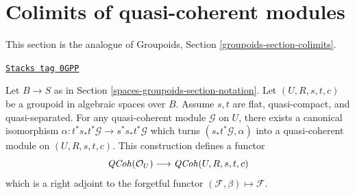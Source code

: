 \section{Colimits of quasi-coherent modules}
\label{spaces-groupoids-section-colimits}
This section is the analogue of
Groupoids, Section \ref{groupoids-section-colimits}.

\begin{lemma}
\label{spaces-groupoids-lemma-construct-quasi-coherent}
\href{https://stacks.math.columbia.edu/tag/0GPP}{\texttt{Stacks tag 0GPP}}

Let $B \to S$ as in Section \ref{spaces-groupoids-section-notation}.
Let $(U, R, s, t, c)$ be a groupoid in algebraic spaces over $B$.
Assume $s, t$ are flat, quasi-compact, and quasi-separated.
For any quasi-coherent module $\mathcal{G}$ on $U$, there exists
a canonical isomorphism
$\alpha : t^*s_*t^*\mathcal{G} \to s^*s_*t^*\mathcal{G}$
which turns $(s_*t^*\mathcal{G}, \alpha)$ into a quasi-coherent module
on $(U, R, s, t, c)$. This construction defines a functor
$$
\mathit{QCoh}(\mathcal{O}_U) \longrightarrow \mathit{QCoh}(U, R, s, t, c)
$$
which is a right adjoint to the forgetful functor
$(\mathcal{F}, \beta) \mapsto \mathcal{F}$.
\end{lemma}


